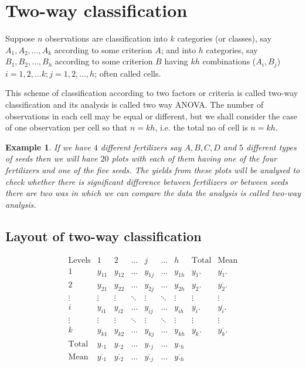 \documentclass[oneside,11pt,pdftex]{book}%
\numberwithin{equation}{section}
\newtheorem{example}[theorem]{Example}
\numberwithin{section}{chapter}
\numberwithin{equation}{chapter}
\begin{document}
\section{Two-way classification}
Suppose $ n $ observations are classification into $ k $ categories (or classes), say $ A_1, A_2, \dots, A_k $ according to some criterion $ A $; and into $ h $ categories, say $ B_1, B_2, \dots, B_h $ according to some criterion $ B$ having $ kh $ combinations ($ A_i,B_j $) $ i=1,2,\dots k; j=1,2,\dots, h $; often called cells.\par
This scheme of classification according to two factors or criteria is called two-way classification and its analysis is called two way ANOVA. The number of observations in each cell may be equal or different, but we shall consider the case of one observation per cell so that $ n=kh $, i.e. the total no of cell is $ n=kh $.

\begin{example}
	If we have $ 4 $ different fertilizers say $ A,B,C,D $ and $ 5 $ different types of seeds then we will have $ 20 $ plots with each of them having one of the four fertilizers and one of the five seeds. The yields from these plots will be analysed to check whether there is significant difference between fertilizers or between seeds there are two was in which we can compare the data the analysis is called two-way analysis.
\end{example}

\subsection{Layout of two-way classification}
\[ \begin{matrix}
	\text{Levels} & 1 & 2 & \dots & j & \dots & h & \text{Total} & \text{Mean}\\
	1 & y_{11} & y_{12} & \dots & y_{1j} & \dots & y_{1h} & y_1. & \overline{y_1.}\\
	2 & y_{21} & y_{22} & \dots & y_{2j} & \dots & y_{2h} & y_2. & \overline{y_2.}\\
	\vdots & \vdots & \vdots & \ddots & \vdots & \ddots & \vdots & \vdots & \vdots\\
	i & y_{i1} & y_{i2} & \dots & y_{ij} & \dots & y_{ih} & y_i. & \overline{y_i.}\\
	\vdots & \vdots & \vdots & \ddots & \vdots & \ddots & \vdots & \vdots & \vdots\\
	k & y_{k1} & y_{k2} & \dots & y_{kj} & \dots & y_{kh} & y_k. & \overline{y_k.}\\
	\text{Total} & y._1 & y._2 & \dots & y._j & \dots & y._h &  & \\
	\text{Mean} & \overline{y._1} & \overline{y._2} & \dots & \overline{y._j} & \dots & \overline{y._h} &  & \\
\end{matrix} \]
\end{document}

